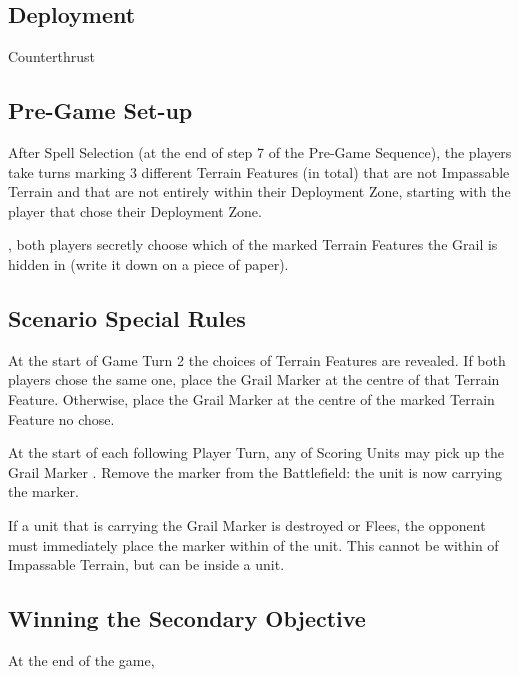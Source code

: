 
\label{TheHolyGrail}

\subsection*{Deployment}

 Counterthrust


\subsection*{Pre-Game Set-up}

After Spell Selection (at the end of step 7 of the Pre-Game Sequence), the players take turns marking 3 different Terrain Features (in total) that are not Impassable Terrain and that are not entirely within their Deployment Zone, starting with the player that chose their Deployment Zone.

, both players secretly choose which of the marked Terrain Features the Grail is hidden in (write it down on a piece of paper).

\subsection*{Scenario Special Rules}

At the start of Game Turn 2\rewordedrule{,} the choices of Terrain Features are revealed. If both players chose the same one, place the Grail Marker at the centre of that Terrain Feature. Otherwise, place the Grail Marker at the centre of the marked Terrain Feature no chose.

At the start of each following Player Turn, any of  Scoring Units may pick up the Grail Marker . Remove the marker from the Battlefield: the unit is now carrying the marker. 

If a unit that is carrying the Grail Marker is destroyed or Flees, the opponent must immediately place the marker  within  of the unit. This  cannot be within  of Impassable Terrain, but can be inside a unit.

\subsection*{Winning the Secondary Objective}

At the end of the game, 
